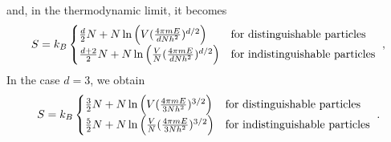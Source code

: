     and, in the thermodynamic limit, it becomes
    \begin{equation*}
        S = k_B \begin{cases}
            \frac{d}{2} N + N \ln \Big ( V (\frac{4 \pi m E}{d N h^2})^{d/2} \Big) & \textnormal{for distinguishable particles} \\
            \frac{d + 2}{2} N + N \ln \Big ( \frac{V}{N} (\frac{4 \pi m E}{d N h^2})^{d/2} \Big) & \textnormal{for indistinguishable particles} \\
        \end{cases} ~,
    \end{equation*}
    In the case $d = 3$, we obtain 
    \begin{equation*}
        S = k_B \begin{cases}
            \frac{3}{2} N + N \ln \Big ( V (\frac{4 \pi m E}{3 N h^2})^{3/2} \Big) & \textnormal{for distinguishable particles} \\
            \frac{5}{2} N + N \ln \Big ( \frac{V}{N} (\frac{4 \pi m E}{3 N h^2})^{3/2} \Big) & \textnormal{for indistinguishable particles} \\
        \end{cases} ~.
    \end{equation*}
